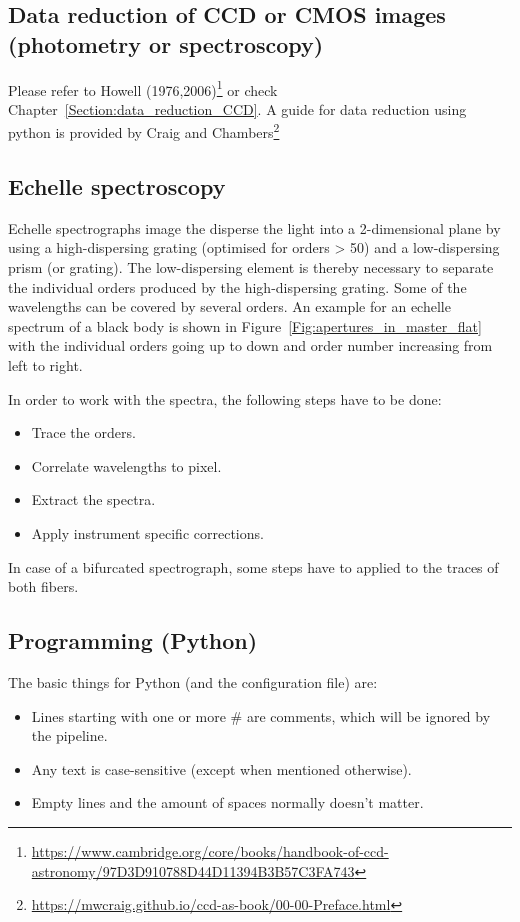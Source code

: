 \documentclass[10pt,a4paper]{article}
\begin{document}
\subsection*{Data reduction of CCD or CMOS images (photometry or spectroscopy)}
Please refer to Howell (1976,2006)\footnote{\url{https://www.cambridge.org/core/books/handbook-of-ccd-astronomy/97D3D910788D44D11394B3B57C3FA743}} or check Chapter~\ref{Section:data_reduction_CCD}. A guide for data reduction using python is provided by Craig and Chambers\footnote{\url{https://mwcraig.github.io/ccd-as-book/00-00-Preface.html}}

\subsection*{Echelle spectroscopy}
Echelle spectrographs image the disperse the light into a 2-dimensional plane by using a high-dispersing grating (optimised for orders > 50) and a low-dispersing prism (or grating). The low-dispersing element is thereby necessary to separate the individual orders produced by the high-dispersing grating. Some of the wavelengths can be covered by several orders. An example for an echelle spectrum of a black body is shown in Figure~\ref{Fig:apertures_in_master_flat} with the individual orders going up to down and order number increasing from left to right.

In order to work with the spectra, the following steps have to be done:
\begin{itemize}
  \item Trace the orders.
  \item Correlate wavelengths to pixel.
  \item Extract the spectra.
  \item Apply instrument specific corrections.
\end{itemize}
In case of a bifurcated spectrograph, some steps have to applied to the traces of both fibers.

\subsection*{Programming (Python)}
The basic things for Python (and the configuration file) are:
\begin{itemize}
  \item Lines starting with one or more \# are comments, which will be ignored  by the pipeline.
  \item Any text is case-sensitive (except when mentioned otherwise).
  \item Empty lines and the amount of spaces normally doesn't matter.
\end{itemize}
\end{document}
